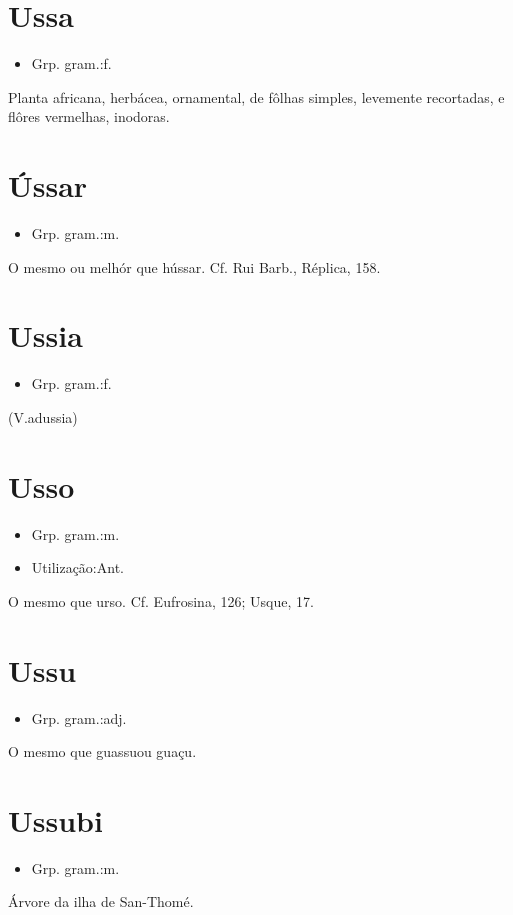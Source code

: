 \documentclass{article}
\begin{document}
\section{Ussa}
\begin{itemize}
\item {Grp. gram.:f.}
\end{itemize}
Planta africana, herbácea, ornamental, de fôlhas simples, levemente recortadas, e flôres vermelhas, inodoras.
\section{Ússar}
\begin{itemize}
\item {Grp. gram.:m.}
\end{itemize}
O mesmo ou melhór que \textunderscore hússar\textunderscore . Cf. Rui Barb., \textunderscore Réplica\textunderscore , 158.
\section{Ussia}
\begin{itemize}
\item {Grp. gram.:f.}
\end{itemize}
(V.adussia)
\section{Usso}
\begin{itemize}
\item {Grp. gram.:m.}
\end{itemize}
\begin{itemize}
\item {Utilização:Ant.}
\end{itemize}
O mesmo que \textunderscore urso\textunderscore . Cf. \textunderscore Eufrosina\textunderscore , 126; Usque, 17.
\section{Ussu}
\begin{itemize}
\item {Grp. gram.:adj.}
\end{itemize}
O mesmo que \textunderscore guassu\textunderscore  ou \textunderscore guaçu\textunderscore .
\section{Ussubi}
\begin{itemize}
\item {Grp. gram.:m.}
\end{itemize}
Árvore da ilha de San-Thomé.
\end{document}
